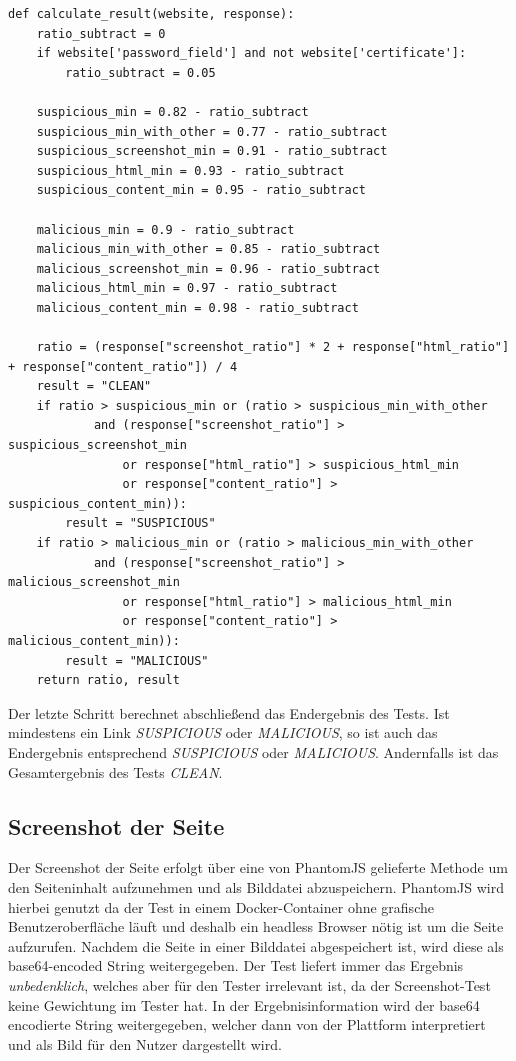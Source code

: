 \begin{scriptsize}
\begin{lstlisting}
def calculate_result(website, response):
    ratio_subtract = 0
    if website['password_field'] and not website['certificate']:
        ratio_subtract = 0.05

    suspicious_min = 0.82 - ratio_subtract
    suspicious_min_with_other = 0.77 - ratio_subtract
    suspicious_screenshot_min = 0.91 - ratio_subtract
    suspicious_html_min = 0.93 - ratio_subtract
    suspicious_content_min = 0.95 - ratio_subtract

    malicious_min = 0.9 - ratio_subtract
    malicious_min_with_other = 0.85 - ratio_subtract
    malicious_screenshot_min = 0.96 - ratio_subtract
    malicious_html_min = 0.97 - ratio_subtract
    malicious_content_min = 0.98 - ratio_subtract

    ratio = (response["screenshot_ratio"] * 2 + response["html_ratio"] + response["content_ratio"]) / 4
    result = "CLEAN"
    if ratio > suspicious_min or (ratio > suspicious_min_with_other
            and (response["screenshot_ratio"] > suspicious_screenshot_min
                or response["html_ratio"] > suspicious_html_min
                or response["content_ratio"] > suspicious_content_min)):
        result = "SUSPICIOUS"
    if ratio > malicious_min or (ratio > malicious_min_with_other
            and (response["screenshot_ratio"] > malicious_screenshot_min
                or response["html_ratio"] > malicious_html_min
                or response["content_ratio"] > malicious_content_min)):
        result = "MALICIOUS"
    return ratio, result
\end{lstlisting}
\end{scriptsize}

Der letzte Schritt berechnet abschließend das Endergebnis des Tests. Ist mindestens ein Link \textit{SUSPICIOUS} oder \textit{MALICIOUS}, so ist auch das Endergebnis entsprechend \textit{SUSPICIOUS} oder \textit{MALICIOUS}. Andernfalls ist das Gesamtergebnis des Tests \textit{CLEAN}.

\subsection{Screenshot der Seite}
Der Screenshot der Seite erfolgt über eine von PhantomJS gelieferte Methode um den Seiteninhalt aufzunehmen und als Bilddatei abzuspeichern. PhantomJS wird hierbei genutzt da der Test in einem Docker-Container ohne grafische Benutzeroberfläche läuft und deshalb ein headless Browser nötig ist um die Seite aufzurufen. Nachdem die Seite in einer Bilddatei abgespeichert ist, wird diese als base64-encoded String weitergegeben. Der Test liefert immer das Ergebnis \textit{unbedenklich}, welches aber für den Tester irrelevant ist, da der Screenshot-Test keine Gewichtung im Tester hat. In der Ergebnisinformation wird der base64 encodierte String weitergegeben, welcher dann von der Plattform interpretiert und als Bild für den Nutzer dargestellt wird.
